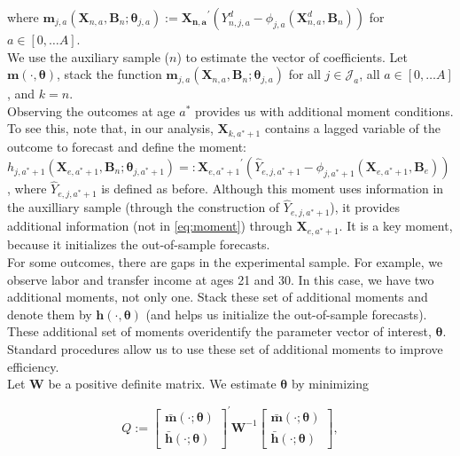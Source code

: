 \noindent where $\bm{m}_{j,a} \left( \bm{X}_{n,a}, \bm{B}_{n} ; \bm{\theta}_{j,a} \right) := {\bm{X_{n,a}}}^{'} \left( Y_{n,j,a}^d -   \phi_{j,a} \left( \bm{X}_{n,a}^d, \bm{B}_{n} \right) \right)$ for $a \in [0, \ldots A]$.\\

\noindent We use the auxiliary sample ($n$) to estimate the vector of coefficients. Let $\bm{m} \left ( \cdot, \bm{\theta} \right)$, stack the function $\bm{m}_{j,a} \left( \bm{X}_{n,a}, \bm{B}_{n} ; \bm{\theta}_{j,a} \right)$  for all $j \in \mathcal{J}_a$, all $a \in [0, \ldots A]$, and $k = n$.\\

\noindent Observing the outcomes at age $a^*$ provides us with additional moment conditions. To see this, note that, in our analysis,  $\bm{X}_{k,a^*+1}$ contains a lagged variable of the outcome to forecast and define the moment: $h_{j,a^*+1}  \left( \bm{X}_{e,a^*+1}, \bm{B}_{n} ; \bm{\theta}_{j,a^*+1} \right) =:  {\bm{X}_{e,a^*+1}}^{'} \left( \hat{Y}_{e,j,a^*+1} - \phi_{j,a^*+1} \left ( \bm{X}_{e,a^*+1}, \bm{B}_{e} \right) \right)$, where $\hat{Y}_{e,j,a^*+1}$ is defined as before. Although this moment uses information in the auxilliary sample (through the construction of $\hat{Y}_{e,j,a^*+1}$), it provides additional information (not in \eqref{eq:moment}) through $\bm{X}_{e,a^*+1}$. It is a key moment, because it initializes the out-of-sample forecasts.\\

\noindent For some outcomes, there are gaps in the experimental sample. For example, we observe labor and transfer income at ages 21 and 30. In this case, we have two additional moments, not only one. Stack these set of additional moments and denote them by $\bm{h} \left ( \cdot, \bm{\theta} \right)$ (and helps us initialize the out-of-sample forecasts). These additional set of moments overidentify the parameter vector of interest, $\bm{\theta}$. Standard procedures allow us to use these set of additional moments to improve efficiency.\\

\noindent Let $\bm{W}$ be a positive definite matrix. We estimate $\bm{\theta}$ by minimizing

\begin{equation}
Q :=  {\begin{bmatrix} {\bm{\bar{m}} \left( \cdot ; \bm{\theta} \right) }  \\ {\bm{\bar{h}} \left( \cdot ; \bm{\theta} \right) }  \end{bmatrix}}^{'}
\bm{W} ^{-1}{\begin{bmatrix} {\bm{\bar{m}} \left( \cdot ; \bm{\theta} \right) }  \\ {\bm{\bar{h}} \left( \cdot ; \bm{\theta} \right) }  \end{bmatrix}}, \label{eq:wloss}
\end{equation}\\

